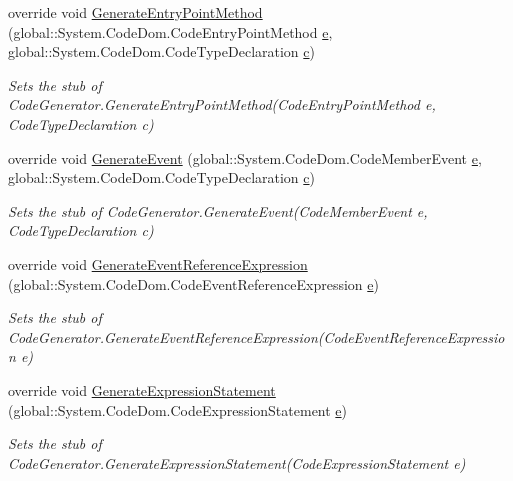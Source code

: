 \begin{DoxyCompactItemize}
override void \hyperlink{class_system_1_1_code_dom_1_1_compiler_1_1_fakes_1_1_stub_code_compiler_a14ade1c26ff44fbe9f34be8d73737974}{Generate\-Entry\-Point\-Method} (global\-::\-System.\-Code\-Dom.\-Code\-Entry\-Point\-Method \hyperlink{jquery-1_810_82_8min_8js_a2c038346d47955cbe2cb91e338edd7e1}{e}, global\-::\-System.\-Code\-Dom.\-Code\-Type\-Declaration \hyperlink{bootstrap_8min_8js_abce695e0af988ece0826d9ad59b8160d}{c})
\begin{DoxyCompactList}\small\item\em Sets the stub of Code\-Generator.\-Generate\-Entry\-Point\-Method(\-Code\-Entry\-Point\-Method e, Code\-Type\-Declaration c)\end{DoxyCompactList}\item 
override void \hyperlink{class_system_1_1_code_dom_1_1_compiler_1_1_fakes_1_1_stub_code_compiler_a7c8ed774bc9bd0cabbaa900db494628b}{Generate\-Event} (global\-::\-System.\-Code\-Dom.\-Code\-Member\-Event \hyperlink{jquery-1_810_82_8min_8js_a2c038346d47955cbe2cb91e338edd7e1}{e}, global\-::\-System.\-Code\-Dom.\-Code\-Type\-Declaration \hyperlink{bootstrap_8min_8js_abce695e0af988ece0826d9ad59b8160d}{c})
\begin{DoxyCompactList}\small\item\em Sets the stub of Code\-Generator.\-Generate\-Event(\-Code\-Member\-Event e, Code\-Type\-Declaration c)\end{DoxyCompactList}\item 
override void \hyperlink{class_system_1_1_code_dom_1_1_compiler_1_1_fakes_1_1_stub_code_compiler_a2198bd12f5a9fe2f856d12b026d37682}{Generate\-Event\-Reference\-Expression} (global\-::\-System.\-Code\-Dom.\-Code\-Event\-Reference\-Expression \hyperlink{jquery-1_810_82_8min_8js_a2c038346d47955cbe2cb91e338edd7e1}{e})
\begin{DoxyCompactList}\small\item\em Sets the stub of Code\-Generator.\-Generate\-Event\-Reference\-Expression(\-Code\-Event\-Reference\-Expression e)\end{DoxyCompactList}\item 
override void \hyperlink{class_system_1_1_code_dom_1_1_compiler_1_1_fakes_1_1_stub_code_compiler_a526c468c72e98348cd6a51baa41fb31d}{Generate\-Expression\-Statement} (global\-::\-System.\-Code\-Dom.\-Code\-Expression\-Statement \hyperlink{jquery-1_810_82_8min_8js_a2c038346d47955cbe2cb91e338edd7e1}{e})
\begin{DoxyCompactList}\small\item\em Sets the stub of Code\-Generator.\-Generate\-Expression\-Statement(\-Code\-Expression\-Statement e)\end{DoxyCompactList}\item 

\end{DoxyCompactItemize}
